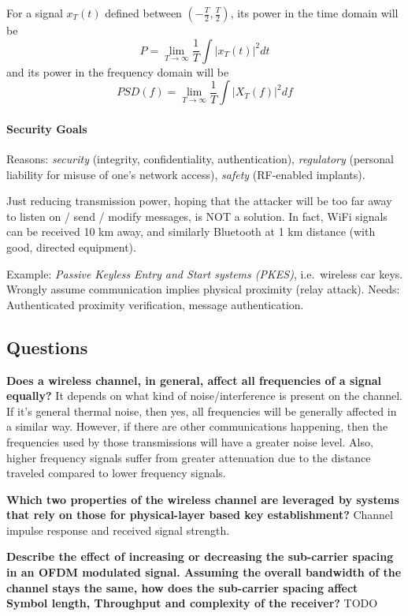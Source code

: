 For a signal $x_T(t)$ defined between $(-\frac{T}{2}, \frac{T}{2})$, its power in the time domain will be \[P = \lim_{T\rightarrow \infty} \frac{1}{T} \int |x_T(t)|^2 dt \] and its power in the frequency domain will be \[PSD(f) = \lim_{T\rightarrow \infty} \frac{1}{T} \int |X_T(f)|^2 df \]

\paragraph{Security Goals}
Reasons: \textit{security} (integrity, confidentiality, authentication), \textit{regulatory} (personal liability for misuse of one's network access), \textit{safety} (RF-enabled implants).

Just reducing transmission power, hoping that the attacker will be too far away to listen on / send / modify messages, is NOT a solution.
In fact, WiFi signals can be received 10 km away, and similarly Bluetooth at 1 km distance (with good, directed equipment).

Example: \textit{Passive Keyless Entry and Start systems (PKES)}, i.e.\ wireless car keys.
Wrongly assume communication implies physical proximity (relay attack).
Needs: Authenticated proximity verification, message authentication.

\subsection{Questions}
\textbf{Does a wireless channel, in general, affect all frequencies of a signal equally?} It depends on what kind of noise/interference is present on the channel. If it's general thermal noise, then yes, all frequencies will be generally affected in a similar way. However, if there are other communications happening, then the frequencies used by those transmissions will have a greater noise level.
Also, higher frequency signals suffer from greater attenuation due to the distance traveled compared to lower frequency signals.

\textbf{Which two properties of the wireless channel are leveraged by systems that rely on those for physical-layer based key establishment?} Channel impulse response and received signal strength.

\textbf{Describe the effect of increasing or decreasing the sub-carrier spacing in an OFDM modulated signal. Assuming the overall bandwidth of the channel stays the same, how does the sub-carrier spacing affect Symbol length, Throughput and complexity of the receiver?} TODO %
